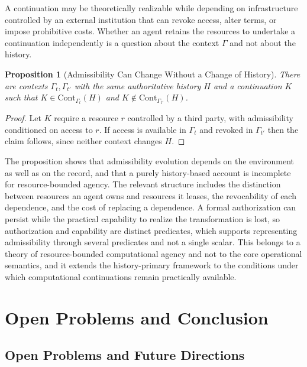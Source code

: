 \documentclass[12pt,oneside,openany]{book}
\theoremstyle{spherepop}
\newtheorem{proposition}[definition]{Proposition}
\theoremstyle{remarkstyle}
\begin{document}
A continuation may be theoretically realizable while depending on infrastructure controlled by an external institution that can revoke access, alter terms, or impose prohibitive costs. Whether an agent retains the resources to undertake a continuation independently is a question about the context $\Gamma$ and not about the history.

\begin{proposition}[Admissibility Can Change Without a Change of History]
There are contexts $\Gamma_t,\Gamma_{t'}$ with the same authoritative history $H$ and a continuation $K$ such that $K\in\mathrm{Cont}_{\Gamma_t}(H)$ and $K\notin\mathrm{Cont}_{\Gamma_{t'}}(H)$.
\end{proposition}

\begin{proof}
Let $K$ require a resource $r$ controlled by a third party, with admissibility conditioned on access to $r$. If access is available in $\Gamma_t$ and revoked in $\Gamma_{t'}$ then the claim follows, since neither context changes $H$.
\end{proof}

The proposition shows that admissibility evolution depends on the environment as well as on the record, and that a purely history-based account is incomplete for resource-bounded agency. The relevant structure includes the distinction between resources an agent owns and resources it leases, the revocability of each dependence, and the cost of replacing a dependence. A formal authorization can persist while the practical capability to realize the transformation is lost, so authorization and capability are distinct predicates, which supports representing admissibility through several predicates and not a single scalar. This belongs to a theory of resource-bounded computational agency and not to the core operational semantics, and it extends the history-primary framework to the conditions under which computational continuations remain practically available.

\part{Open Problems and Conclusion}

\chapter{Open Problems and Future Directions}
\label{ch:future}
\end{document}
